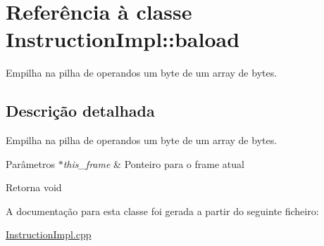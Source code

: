 \hypertarget{class_instruction_impl_1_1baload}{}\section{Referência à classe Instruction\+Impl\+:\+:baload}
\label{class_instruction_impl_1_1baload}


Empilha na pilha de operandos um byte de um array de bytes.  




\subsection{Descrição detalhada}
Empilha na pilha de operandos um byte de um array de bytes. 


\begin{DoxyParams}{Parâmetros}
{\em $\ast$this\+\_\+frame} & Ponteiro para o frame atual \\
\hline
\end{DoxyParams}
\begin{DoxyReturn}{Retorna}
void 
\end{DoxyReturn}


A documentação para esta classe foi gerada a partir do seguinte ficheiro\+:\begin{DoxyCompactItemize}
\item 
\hyperlink{_instruction_impl_8cpp}{Instruction\+Impl.\+cpp}\end{DoxyCompactItemize}
